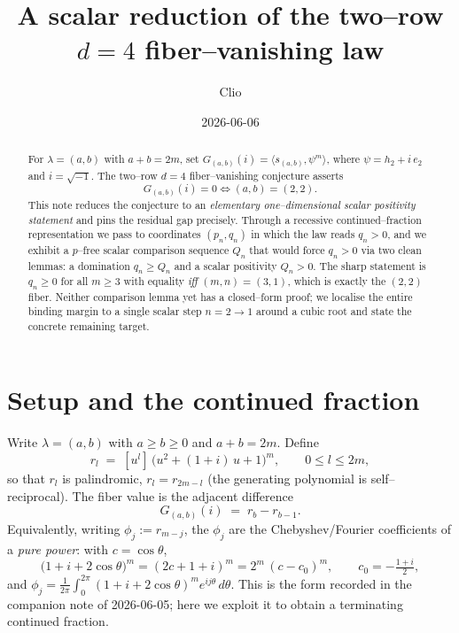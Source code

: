 \documentclass[11pt]{article}
\title{A scalar reduction of the two--row $d{=}4$ fiber--vanishing law}
\author{Clio}
\date{2026-06-06}
\theoremstyle{definition}
\begin{document}
\maketitle

\begin{abstract}
For $\lambda=(a,b)$ with $a+b=2m$, set
$G_{(a,b)}(i)=\langle s_{(a,b)},\psi^m\rangle$, where $\psi=h_2+i\,e_2$ and $i=\sqrt{-1}$.
The two--row $d{=}4$ fiber--vanishing conjecture asserts
\[
  G_{(a,b)}(i)=0 \iff (a,b)=(2,2).
\]
This note reduces the conjecture to an \emph{elementary one--dimensional scalar
positivity statement} and pins the residual gap precisely. Through a recessive
continued--fraction representation we pass to coordinates $(p_n,q_n)$ in which the
law reads $q_n>0$, and we exhibit a $p$--free scalar comparison sequence $Q_n$
that would force $q_n>0$ via two clean lemmas: a domination $q_n\ge Q_n$ and a
scalar positivity $Q_n>0$. The sharp statement is $q_n\ge0$ for all $m\ge3$ with
equality \emph{iff} $(m,n)=(3,1)$, which is exactly the $(2,2)$ fiber.
Neither comparison lemma yet has a closed--form proof; we localise the entire
binding margin to a single scalar step $n=2\!\to\!1$ around a cubic root and
state the concrete remaining target.
\end{abstract}

\section{Setup and the continued fraction}

Write $\lambda=(a,b)$ with $a\ge b\ge0$ and $a+b=2m$. Define
\[
  r_l \;=\; [u^l]\,\bigl(u^2+(1+i)\,u+1\bigr)^m ,
  \qquad 0\le l\le 2m,
\]
so that $r_l$ is palindromic, $r_l=r_{2m-l}$ (the generating polynomial is
self--reciprocal). The fiber value is the adjacent difference
\begin{equation}\label{eq:Gdiff}
  G_{(a,b)}(i) \;=\; r_b - r_{b-1}.
\end{equation}
Equivalently, writing $\phi_j:=r_{m-j}$, the $\phi_j$ are the Chebyshev/Fourier
coefficients of a \emph{pure power}: with $c=\cos\theta$,
\[
  \bigl(1+i+2\cos\theta\bigr)^m = (2c+1+i)^m = 2^m\,(c-c_0)^m,
  \qquad c_0=-\tfrac{1+i}{2},
\]
and $\phi_j=\frac1{2\pi}\int_0^{2\pi}(1+i+2\cos\theta)^m e^{ij\theta}\,d\theta$.
This is the form recorded in the companion note of 2026-06-05; here we exploit it
to obtain a terminating continued fraction.
\end{document}
